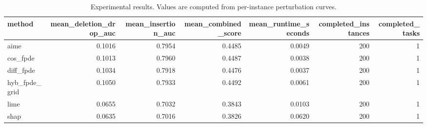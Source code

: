 \begin{table}[t]
\caption{Experimental results. Values are computed from per-instance perturbation curves.}
\label{tab:main_results_computed}
\centering
\begin{tabular}{lrrrrrr}
\toprule
method & mean\_deletion\_drop\_auc & mean\_insertion\_auc & mean\_combined\_score & mean\_runtime\_seconds & completed\_instances & completed\_tasks \\
\midrule
aime & 0.1016 & 0.7954 & 0.4485 & 0.0049 & 200 & 1 \\
cos\_fpde & 0.1013 & 0.7960 & 0.4487 & 0.0038 & 200 & 1 \\
diff\_fpde & 0.1034 & 0.7918 & 0.4476 & 0.0037 & 200 & 1 \\
hyb\_fpde\_grid & 0.1050 & 0.7933 & 0.4492 & 0.0061 & 200 & 1 \\
lime & 0.0655 & 0.7032 & 0.3843 & 0.0103 & 200 & 1 \\
shap & 0.0635 & 0.7016 & 0.3826 & 0.0620 & 200 & 1 \\
\bottomrule
\end{tabular}

\end{table}
